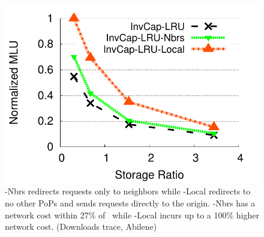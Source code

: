 %
%







\begin{figure}[t]
\begin{center}
\includegraphics[scale=0.6]{graphSet1/lrulocalnew/AbileneDownloads.pdf}
\end{center}
\caption{\textsf{\invlru-Nbrs} redirects requests only to neighbors while \textsf{\invlru-Local} redirects to no other PoPs and sends requests directly to the origin. 
\textsf{\invlru-Nbrs} has a network cost within 27\% of \invlru\ while \textsf{\invlru-Local} incurs up to a 100\% higher network cost. (Downloads trace, Abilene) }
\label{fig:lrulocalnew}
\end{figure}

